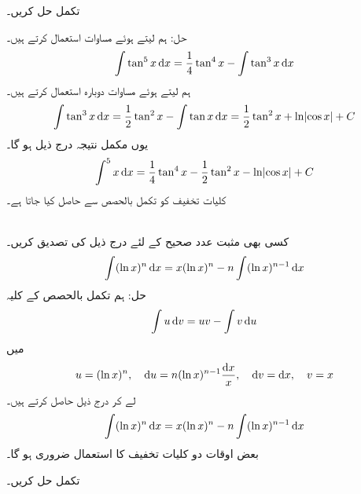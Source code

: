 تکمل  حل کریں۔

حل:\quad
ہم  لیتے ہوئے مساوات  استعمال کرتے ہیں۔
\begin{align*}
\int\tan^5x\dif x=\frac{1}{4}\tan^4x-\int\tan^3x\dif x
\end{align*}
ہم  لیتے ہوئے  مساوات  دوبارہ استعمال کرتے ہیں۔
\begin{align*}
\int\tan^3x\dif x=\frac{1}{2}\tan^2x-\int \tan x\dif x=\frac{1}{2}\tan^2x+\ln\abs{\cos x}+C
\end{align*}
یوں مکمل نتیجہ درج ذیل ہو گا۔
\begin{align*}
\int^5x \dif x=\frac{1}{4}\tan^4x-\frac{1}{2}\tan^2x-\ln\abs{\cos x}+C
\end{align*}
کلیات تخفیف کو تکمل بالحصص سے حاصل کیا جاتا ہے۔

\\
کسی بھی مثبت عدد صحیح  کے لئے درج ذیل کی تصدیق کریں۔
\begin{align*}
\int (\ln x)^n\dif x=x(\ln x)^n-n\int (\ln x)^{n-1}\dif x
\end{align*}
حل:\quad
ہم تکمل بالحصص کے کلیہ
\begin{align*}
\int u\dif v=uv-\int v\dif u
\end{align*}
میں
\begin{align*}
u=(\ln x)^n,\quad \dif u=n(\ln x)^{n-1}\frac{\dif x}{x},\quad \dif v=\dif x,\quad v=x
\end{align*}
لے کر درج ذیل حاصل کرتے ہیں۔
\begin{align*}
\int (\ln x)^n\dif x=x(\ln x)^n-n\int (\ln x)^{n-1}\dif x
\end{align*}
بعض اوقات دو کلیات تخفیف کا استعمال ضروری ہو گا۔

تکمل  حل کریں۔

